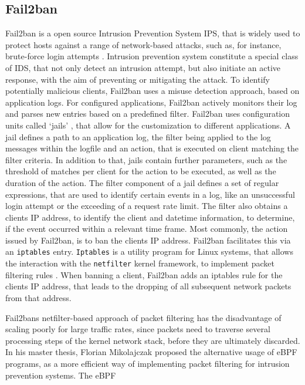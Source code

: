 \subsection{Fail2ban} \label{sec:fail2ban}

Fail2ban is a open source Intrusion Prevention System \ac{IPS}, that is widely used to protect hosts against a range of network-based attacks, such as, for instance, brute-force login attempts \cite{fail2ban}. Intrusion prevention system constitute
a special class of \ac{IDS}, that not only detect an intrusion attempt, but also initiate an active response, with the aim of preventing or mitigating the attack. To identify potentially malicious clients,
Fail2ban uses a misuse detection approach, based on application logs. For configured applications, Fail2ban actively monitors their log and parses new entries based on a predefined filter. Fail2ban uses configuration units called `jails'  
, that allow for the customization to different applications. A jail defines a path to an application log, the filter being applied to the log messages within the logfile and an action, that
is executed on client matching the filter criteria. In addition to that, jails contain further parameters, such as the threshold of matches per client for the action to be executed,
as well as the duration of the action. The filter component of a jail defines a set of regular expressions, that are used to identify certain events in a log, like an unsuccessful login attempt or the 
exceeding of a request rate limit. The filter also obtains a clients IP address, to identify the client and datetime information, to determine, if the event occurred within a relevant time frame. 
Most commonly, the action issued by Fail2ban, is to ban the clients IP address. Fail2ban facilitates this via an \texttt{iptables} entry. 
\texttt{Iptables} is a utility program for Linux systems, that allows the interaction with the \texttt{netfilter} kernel framework, to implement packet filtering rules \cite{netfiler,iptables}. When banning a client, Fail2ban adds an iptables rule for the clients IP address, that leads 
to the dropping of all subsequent network packets from that address.
\par
Fail2bans netfilter-based approach of packet filtering has the disadvantage of scaling poorly for large traffic rates, since packets need to traverse several processing steps of the kernel network stack, before they are ultimately discarded.
In his master thesis, Florian Mikolajczak proposed the alternative usage of eBPF programs, as a more efficient way of implementing packet filtering for intrusion prevention systems\cite{mikolajczak2022}. The \ac{eBPF}      
